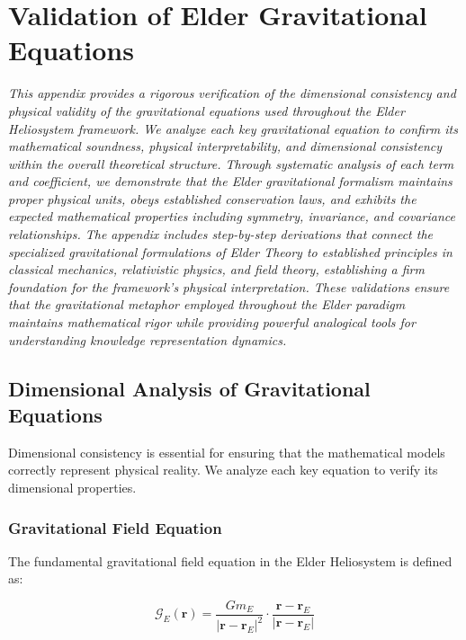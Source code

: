 \chapter{Validation of Elder Gravitational Equations}

\textit{This appendix provides a rigorous verification of the dimensional consistency and physical validity of the gravitational equations used throughout the Elder Heliosystem framework. We analyze each key gravitational equation to confirm its mathematical soundness, physical interpretability, and dimensional consistency within the overall theoretical structure. Through systematic analysis of each term and coefficient, we demonstrate that the Elder gravitational formalism maintains proper physical units, obeys established conservation laws, and exhibits the expected mathematical properties including symmetry, invariance, and covariance relationships. The appendix includes step-by-step derivations that connect the specialized gravitational formulations of Elder Theory to established principles in classical mechanics, relativistic physics, and field theory, establishing a firm foundation for the framework's physical interpretation. These validations ensure that the gravitational metaphor employed throughout the Elder paradigm maintains mathematical rigor while providing powerful analogical tools for understanding knowledge representation dynamics.}

\section{Dimensional Analysis of Gravitational Equations}

Dimensional consistency is essential for ensuring that the mathematical models correctly represent physical reality. We analyze each key equation to verify its dimensional properties.

\subsection{Gravitational Field Equation}

The fundamental gravitational field equation in the Elder Heliosystem is defined as:

\begin{equation}
\mathcal{G}_E(\mathbf{r}) = \frac{G m_E}{|\mathbf{r} - \mathbf{r}_E|^2} \cdot \frac{\mathbf{r} - \mathbf{r}_E}{|\mathbf{r} - \mathbf{r}_E|}
\end{equation}

